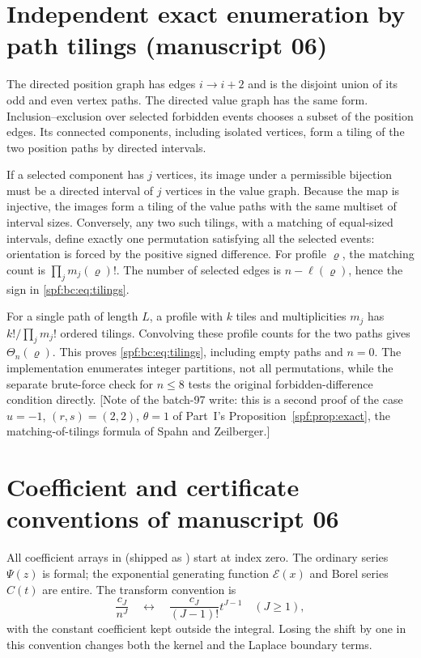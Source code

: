 \documentclass[11pt]{article}
\numberwithin{equation}{section}
\theoremstyle{definition}
\theoremstyle{remark}
\theoremstyle{definition}
\begin{document}
\section{Independent exact enumeration by path tilings (manuscript 06)}
\label{spf:bc:app:tilings}

The directed position graph has edges $i\to i+2$ and is the disjoint union
of its odd and even vertex paths. The directed value graph has the same form.
Inclusion--exclusion over selected forbidden events chooses a subset of the
position edges. Its connected components, including isolated vertices, form
a tiling of the two position paths by directed intervals.

If a selected component has $j$ vertices, its image under a permissible
bijection must be a directed interval of $j$ vertices in the value graph.
Because the map is injective, the images form a tiling of the value paths
with the same multiset of interval sizes. Conversely, any two such tilings,
with a matching of equal-sized intervals, define exactly one permutation
satisfying all the selected events: orientation is forced by the positive
signed difference. For profile $\varrho$, the matching count is
$\prod_jm_j(\varrho)!$. The number of selected edges is
$n-\ell(\varrho)$, hence the sign in \eqref{spf:bc:eq:tilings}.

For a single path of length $L$, a profile with $k$ tiles and multiplicities
$m_j$ has $k!/\prod_jm_j!$ ordered tilings. Convolving these profile counts
for the two paths gives $\Theta_n(\varrho)$. This proves \eqref{spf:bc:eq:tilings},
including empty paths and $n=0$. The implementation enumerates integer
partitions, not all permutations, while the separate brute-force check for
$n\le8$ tests the original forbidden-difference condition directly.
[Note of the batch-97 write: this is a second proof of the case $u=-1$,
$(r,s)=(2,2)$, $\theta=1$ of Part~I's Proposition~\ref{spf:prop:exact},
the matching-of-tilings formula of Spahn and Zeilberger.]

\section{Coefficient and certificate conventions of manuscript 06}
\label{spf:bc:app:conventions}

All coefficient arrays in  (shipped as
\allowbreak{}) start at index zero.
The ordinary series $\Psi(z)$ is formal; the exponential generating function
$\mathcal E(x)$ and Borel series $\widehat C(t)$ are entire. The transform convention is
\[
 \frac{c_J}{n^J}\quad\longleftrightarrow\quad
 \frac{c_J}{(J-1)!}t^{J-1}\quad(J\ge1),
\]
with the constant coefficient kept outside the integral. Losing the shift
by one in this convention changes both the kernel and the Laplace boundary
terms.
\end{document}
